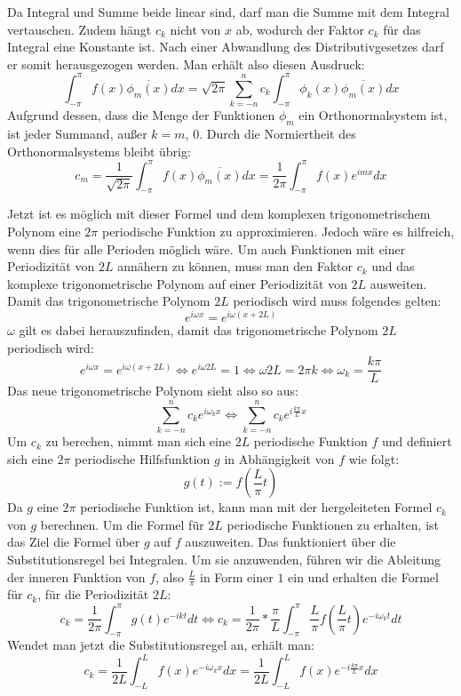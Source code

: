 \documentclass[a4paper,12pt]{article}
\theoremstyle{definition}
\theoremstyle{remark}
\begin{document}
Da Integral und Summe beide linear sind, darf man die Summe mit dem Integral vertauschen. 
Zudem hängt $c_k$ nicht von $x$ ab, wodurch der Faktor $c_k$ für das Integral eine Konstante ist. 
Nach einer Abwandlung des Distributivgesetzes darf er somit herausgezogen werden. Man erhält 
also diesen Ausdruck: 
$$\int_{-\pi}^\pi{f(x)\overline{\phi_m(x)} dx} = \sqrt{2\pi}\sum_{k=-n}^{n}{c_k\int_{-\pi}^\pi{\phi_k(x) \overline{\phi_m(x)} dx}}$$
Aufgrund dessen, dass die Menge der Funktionen $\phi_m$ ein Orthonormalsystem ist, ist jeder Summand, außer $k = m$, 0. Durch die Normiertheit des Orthonormalsystems bleibt übrig:
$$c_m = \frac{1}{\sqrt{2\pi}}\int_{-\pi}^\pi{f(x)\overline{\phi_m(x)}dx} = \frac{1}{2\pi}\int_{-\pi}^\pi{f(x)e^{imx}dx}$$ 

Jetzt ist es möglich mit dieser Formel und dem komplexen trigonometrischem Polynom eine 
$2\pi$ periodische Funktion zu approximieren. Jedoch wäre es hilfreich, wenn dies für alle 
Perioden möglich wäre. Um auch Funktionen mit einer Periodizität von $2L$ annähern zu können, 
muss man den Faktor $c_k$ und das komplexe trigonometrische Polynom auf einer Periodizität von $2L$ ausweiten. 
Damit das trigonometrische Polynom $2L$ periodisch wird muss folgendes gelten: 
$$e^{i\omega x} = e^{i\omega(x+2L)}$$
$\omega$ gilt es dabei herauszufinden, damit das trigonometrische Polynom $2L$ periodisch wird:
$$e^{i\omega x} = e^{i\omega(x+2L)} \Leftrightarrow e^{i\omega 2L} = 1 \Leftrightarrow \omega 2L = 2\pi k \Leftrightarrow \omega_k = \frac{k\pi}{L}$$
Das neue trigonometrische Polynom sieht also so aus:
$$\sum_{k=-n}^n{c_k e^{i\omega_kx}} \Leftrightarrow \sum_{k=-n}^n{c_k e^{i\frac{k\pi}{L}x}}$$
Um $c_k$ zu berechen, nimmt man sich eine $2L$ periodische Funktion $f$ und definiert sich eine $2\pi$ periodische 
Hilfsfunktion $g$ in Abhängigkeit von $f$ wie folgt:
$$g(t) := f\left(\frac{L}{\pi}t\right) $$
Da $g$ eine $2\pi$ periodische Funktion ist, kann man mit der hergeleiteten Formel $c_k$ 
von $g$ berechnen. Um die Formel für $2L$ periodische Funktionen zu erhalten, ist das 
Ziel die Formel über $g$ auf $f$ auszuweiten. Das funktioniert über die Substitutionsregel 
bei Integralen. Um sie anzuwenden, führen wir die Ableitung der inneren Funktion von $f$, 
also $\frac{L}{\pi}$ in Form einer $1$ ein und erhalten die Formel für $c_k$, für die 
Periodizität $2L$: 
$$c_k = \frac{1}{2\pi} \int_{-\pi}^\pi{g(t)e^{-ikt}dt} \Leftrightarrow c_k = \frac{1}{2\pi}*\frac{\pi}{L} \int_{-\pi}^{\pi}{\frac{L}{\pi}f\left(\frac{L}{\pi}t\right)e^{-i\omega_kt} dt}$$
Wendet man jetzt die Substitutionsregel an, erhält man: 
$$c_k = \frac{1}{2L}\int_{-L}^{L}{f(x)e^{-i\omega_kx}dx} = \frac{1}{2L}\int_{-L}^{L}{f(x)e^{-i\frac{k\pi}{L}x}dx}$$
\end{document}
